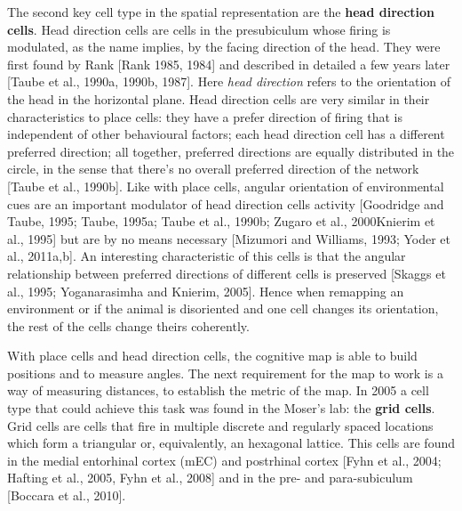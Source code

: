 The second key cell type in the spatial representation are the \textbf{head direction cells}.  
Head direction cells are cells in the presubiculum whose firing is modulated, as the name implies, by the facing direction of the head.
They were first found by Rank [Rank 1985, 1984] and described in detailed a few years later [Taube et al., 1990a, 1990b, 1987].
Here \textit{head direction} refers to the orientation of the head in the horizontal plane.
Head direction cells are very similar in their characteristics to place cells: they have a prefer direction of firing that is independent of other behavioural factors; each head direction cell has a different preferred direction; all together, preferred directions are equally distributed in the circle, in the sense that there's no overall preferred direction of the network [Taube et al., 1990b].
Like with place cells, angular orientation of environmental cues are an important modulator of head direction cells activity [Goodridge and Taube, 1995; Taube, 1995a; Taube et al., 1990b; Zugaro et al., 2000Knierim et al., 1995] but are by no means necessary [Mizumori and Williams, 1993; Yoder et al., 2011a,b].
An interesting characteristic of this cells is that the angular relationship between preferred directions of different cells is preserved [Skaggs et al., 1995; Yoganarasimha and Knierim, 2005].
Hence when remapping an environment or if the animal is disoriented and one cell changes its orientation, the rest of the cells change theirs coherently.

With place cells and head direction cells, the cognitive map is able to build positions and to measure angles. 
The next requirement for the map to work is a way of measuring distances, to establish the metric of the map.
In 2005 a cell type that could achieve this task was found in the Moser's lab: the \textbf{grid cells}. 
Grid cells are cells that fire in multiple discrete and regularly spaced locations which form a triangular or, equivalently, an hexagonal lattice. 
This cells are found in the medial entorhinal cortex (mEC) and postrhinal cortex [Fyhn et al., 2004; Hafting et al., 2005, Fyhn et al., 2008] and in the pre- and para-subiculum [Boccara et al., 2010]. 

